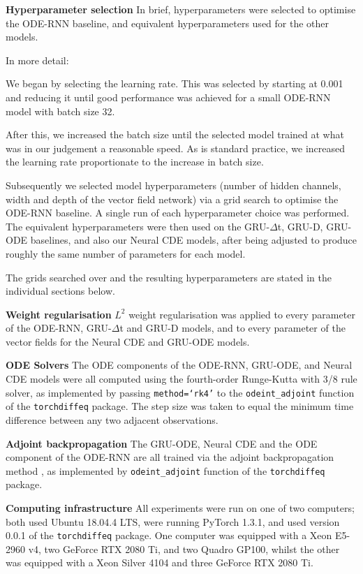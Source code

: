 \documentclass{article}
\theoremstyle{plain}
\theoremstyle{definition}
\newcommand{\boldheading}[1]{

\textbf{#1}\quad}
\begin{document}
	\boldheading{Hyperparameter selection}
	In brief, hyperparameters were selected to optimise the ODE-RNN baseline, and equivalent hyperparameters used for the other models.
	
	In more detail:
	
	We began by selecting the learning rate. This was selected by starting at 0.001 and reducing it until good performance was achieved for a small ODE-RNN model with batch size 32.
	
	After this, we increased the batch size until the selected model trained at what was in our judgement a reasonable speed. As is standard practice, we increased the learning rate proportionate to the increase in batch size.
	
	Subsequently we selected model hyperparameters (number of hidden channels, width and depth of the vector field network) via a grid search to optimise the ODE-RNN baseline. A single run of each hyperparameter choice was performed. The equivalent hyperparameters were then used on the GRU-$\Delta$t, GRU-D, GRU-ODE baselines, and also our Neural CDE models, after being adjusted to produce roughly the same number of parameters for each model.
	
	The grids searched over and the resulting hyperparameters are stated in the individual sections below.
	
	\boldheading{Weight regularisation}
	$L^2$ weight regularisation was applied to every parameter of the ODE-RNN, GRU-$\Delta$t and GRU-D models, and to every parameter of the vector fields for the Neural CDE and GRU-ODE models.
	
	\boldheading{ODE Solvers}
	The ODE components of the ODE-RNN, GRU-ODE, and Neural CDE models were all computed using the fourth-order Runge-Kutta with 3/8 rule solver, as implemented by passing \texttt{method=`rk4'} to the \texttt{odeint\_adjoint} function of the \texttt{torchdiffeq} \cite{torchdiffeq} package. The step size was taken to equal the minimum time difference between any two adjacent observations.
		
	\boldheading{Adjoint backpropagation}
	The GRU-ODE, Neural CDE and the ODE component of the ODE-RNN are all trained via the adjoint backpropagation method \cite{neural-odes}, as implemented by \texttt{odeint\_adjoint} function of the \texttt{torchdiffeq} package.
	
	\boldheading{Computing infrastructure}	
	All experiments were run on one of two computers; both used Ubuntu 18.04.4 LTS, were running PyTorch 1.3.1, and used version 0.0.1 of the \texttt{torchdiffeq} \cite{torchdiffeq} package. One computer was equipped with a Xeon E5-2960 v4, two GeForce RTX 2080 Ti, and two Quadro GP100, whilst the other was equipped with a Xeon Silver 4104 and three GeForce RTX 2080 Ti.
\end{document}
